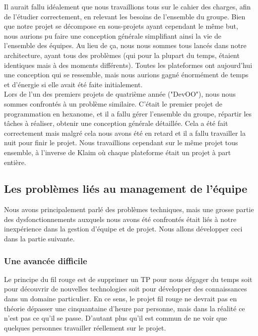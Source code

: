 \documentclass{article}
\begin{document}
		Il aurait fallu idéalement que nous travaillions tous sur le cahier des charges, afin de l'étudier correctement, en relevant les besoins de l'ensemble du groupe. Bien que notre projet se décompose en sous-projets ayant cependant le même but, nous aurions pu faire une conception générale simplifiant ainsi la vie de l'ensemble des équipes. Au lieu de ça, nous nous sommes tous lancés dans notre architecture, ayant tous des problèmes (qui pour la plupart du temps, étaient identiques mais à des moments différents). Toutes les plateformes ont aujourd'hui une conception qui se ressemble, mais nous aurions gagné énormément de temps et d'énergie si elle avait été faite initialement. \\
		
		Lors de l'un des premiers projets de quatrième année ("DevOO"), nous nous sommes confrontés à un problème similaire. C'était le premier projet de programmation en hexanome, et il a fallu gérer l'ensemble du groupe, répartir les tâches à réaliser, obtenir une conception générale détaillée. Cela a été fait correctement mais malgré cela nous avons été en retard et il a fallu travailler la nuit pour finir le projet. Nous travaillions cependant sur le même projet tous ensemble, à l'inverse de Klaim où chaque plateforme était un projet à part entière. \\
		
	\subsection{Les problèmes liés au management de l'équipe}

	Nous avons principalement parlé des problèmes techniques, mais une grosse partie des dysfonctionnements auxquels nous avons été confrontés était liés à notre inexpérience dans la gestion d'équipe et de projet. Nous allons développer ceci dans la partie suivante. 
	
		\subsubsection{Une avancée difficile}
		Le principe du fil rouge est de supprimer un TP pour nous dégager du temps soit pour découvrir de nouvelles technologies soit pour développer des connaissances dans un domaine particulier. En ce sens, le projet fil rouge ne devrait pas en théorie dépasser une cinquantaine d'heure par personne, mais dans la réalité ce n'est pas ce qu'il se passe. D'autant plus qu'il est commun de ne voir que quelques personnes travailler réellement sur le projet. \\
		
\end{document}

